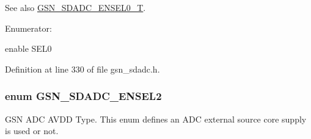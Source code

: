 \begin{DoxySeeAlso}{See also}
\hyperlink{a00652_ga00d5cf84ae6ccebc46f9cd2c1bb63af0}{GSN\_\-SDADC\_\-ENSEL0\_\-T}. 
\end{DoxySeeAlso}
\begin{Desc}
\item[Enumerator: ]\par
\begin{description}
\item[{\em 
\hypertarget{a00652_gga6258977695af5f9fbae5edbdc75d8387ab2910f640d0e35d0f2bd00c6dba7adc2}{
GSN\_\-SDADC\_\-ENSEL0\_\-DISABLE}
\label{a00652_gga6258977695af5f9fbae5edbdc75d8387ab2910f640d0e35d0f2bd00c6dba7adc2}
}]\item[{\em 
\hypertarget{a00652_gga6258977695af5f9fbae5edbdc75d8387a8ce1af0f3cd79de783d7e860d70ad54f}{
GSN\_\-SDADC\_\-ENSEL0\_\-ENABLE}
\label{a00652_gga6258977695af5f9fbae5edbdc75d8387a8ce1af0f3cd79de783d7e860d70ad54f}
}]enable SEL0 \end{description}
\end{Desc}



Definition at line 330 of file gsn\_\-sdadc.h.

\hypertarget{a00652_ga940370ff6d2765c622f7687f6e6eee6a}{
\subsubsection[{GSN\_\-SDADC\_\-ENSEL2}]{\setlength{\rightskip}{0pt plus 5cm}enum {\bf GSN\_\-SDADC\_\-ENSEL2}}}
\label{a00652_ga940370ff6d2765c622f7687f6e6eee6a}


GSN ADC AVDD Type. This enum defines an ADC external source core supply is used or not. 

